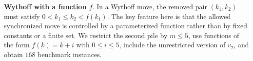 \documentclass[review]{elsarticle}
\newcommand{\set}[1]{\{ #1 \}}
\newcommand{\tuple}[1]{\langle {#1} \rangle}
\newcommand{\true}{\top}
\newcommand{\statevar}{\mathcal{X}}
\newcommand{\act}{\mathcal{A}}
\newcommand{\constraint}{\mathcal{C}}
\newcommand{\estate}{\mathcal{E}}
\newcommand{\pre}{\mathtt{pre}}
\newcommand{\eff}{\mathtt{eff}}
\begin{document}
\textbf{Wythoff with a function $f$}. In a Wythoff move, the removed pair $(k_1,k_2)$ must satisfy $0 < k_1 \le k_2 < f(k_1)$.
The key feature here is that the allowed synchronized move is controlled by a parameterized function rather than by fixed constants or a finite set.
We restrict the second pile by $m \le 5$, use functions of the form $f(k)=k+i$ with $0 \le i \le 5$, include the unrestricted version of $v_2$, and obtain $168$ benchmark instances.
\end{document}
